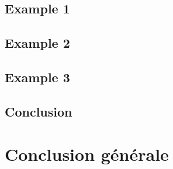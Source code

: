 \documentclass[a4paper,11pt,oneside]{report}
\theoremstyle{plain}
\newcommand{\0}{/ \! \! \! 0}
\theoremstyle{plain}
\begin{document}
\section{Example 1}

\section{Example 2}

\section{Example 3}

\section{Conclusion}

\chapter*{Conclusion g\'en\'erale}
\end{document}
